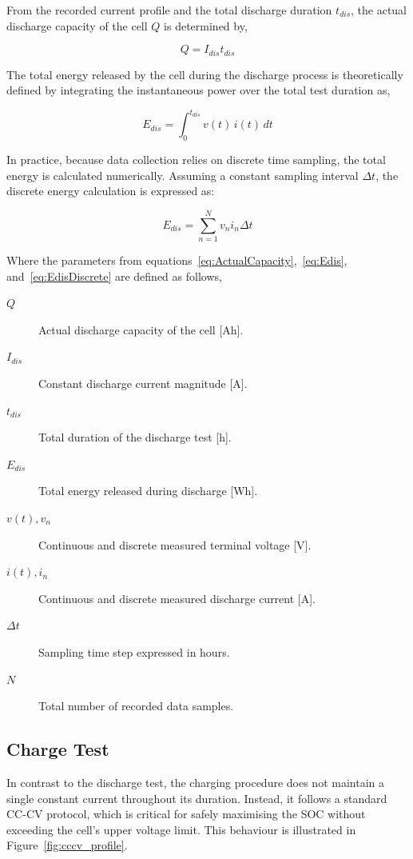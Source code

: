 From the recorded current profile and the total discharge duration $t_{dis}$, the actual discharge capacity 
of the cell $Q$ is determined by,

\begin{equation}
    Q = I_{dis} t_{dis}
    \label{eq:ActualCapacity}
\end{equation}

The total energy released by the cell during the discharge process is theoretically defined by integrating the 
instantaneous power over the total test duration as,

\begin{equation}
    E_{dis} = \int_{0}^{t_{dis}} v(t)\, i(t) \, dt
    \label{eq:Edis}
\end{equation}

In practice, because data collection relies on discrete time sampling, the total energy is calculated numerically. 
Assuming a constant sampling interval $\Delta t$, the discrete energy calculation is expressed as:

\begin{equation}
    E_{dis} = \sum_{n=1}^{N} v_n i_n \Delta t
    \label{eq:EdisDiscrete}
\end{equation}

\noindent Where the parameters from equations~\ref{eq:ActualCapacity},~\ref{eq:Edis}, and~\ref{eq:EdisDiscrete} are 
defined as follows,

\begin{description}
    \item[$Q$] Actual discharge capacity of the cell [Ah].
    \item[$I_{dis}$] Constant discharge current magnitude [A].
    \item[$t_{dis}$] Total duration of the discharge test [h].
    \item[$E_{dis}$] Total energy released during discharge [Wh].
    \item[$v(t), v_n$] Continuous and discrete measured terminal voltage [V].
    \item[$i(t), i_n$] Continuous and discrete measured discharge current [A].
    \item[$\Delta t$] Sampling time step expressed in hours.
    \item[$N$] Total number of recorded data samples.
\end{description}

\subsection{Charge Test}\label{ChargeTest}
In contrast to the discharge test, the charging procedure does not maintain a single constant current throughout its duration. 
Instead, it follows a standard \ac{CC-CV} protocol, which is critical for safely maximising 
the \ac{SOC} without exceeding the cell's upper voltage limit. This behaviour is illustrated in Figure~\ref{fig:cccv_profile}.

